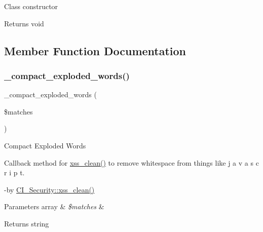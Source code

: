 Class constructor

\begin{DoxyReturn}{Returns}
void 
\end{DoxyReturn}


\subsection{Member Function Documentation}
\mbox{\label{class_c_i___security_adfb0e251ae35ae40303a302d253c3ab2}} 
\subsubsection{\texorpdfstring{\+\_\+compact\+\_\+exploded\+\_\+words()}{\_compact\_exploded\_words()}}
{\footnotesize\ttfamily \+\_\+compact\+\_\+exploded\+\_\+words (\begin{DoxyParamCaption}\item[{}]{\$matches }\end{DoxyParamCaption})\hspace{0.3cm}{\ttfamily [protected]}}

Compact Exploded Words

Callback method for \mbox{\hyperlink{class_c_i___security_acb759426dbab128d3d8164805225381c}{xss\+\_\+clean()}} to remove whitespace from things like \textquotesingle{}j a v a s c r i p t\textquotesingle{}.

-\/by \mbox{\hyperlink{class_c_i___security_acb759426dbab128d3d8164805225381c}{C\+I\+\_\+\+Security\+::xss\+\_\+clean()}} 
\begin{DoxyParams}[1]{Parameters}
array & {\em \$matches} & \\
\hline
\end{DoxyParams}
\begin{DoxyReturn}{Returns}
string 
\end{DoxyReturn}
\mbox{\label{class_c_i___security_ae16451bcdc769285c499cbf8068b3523}} 
